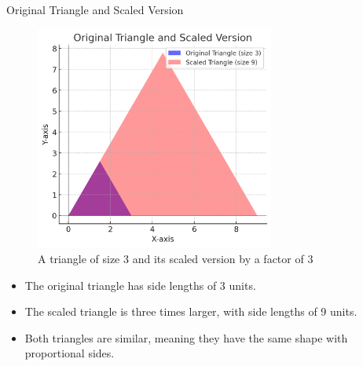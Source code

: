 \documentclass{beamer}
\begin{document}
\begin{frame}{Original Triangle and Scaled Version}
    \begin{figure}
        \centering
        \includegraphics[width=0.7\textwidth]{similar_triangle.png} %
        \caption{A triangle of size 3 and its scaled version by a factor of 3}
    \end{figure}
    \begin{itemize}
        \item The original triangle has side lengths of 3 units.
        \item The scaled triangle is three times larger, with side lengths of 9 units.
        \item Both triangles are similar, meaning they have the same shape with proportional sides.
    \end{itemize}
\end{frame}
\end{document}
